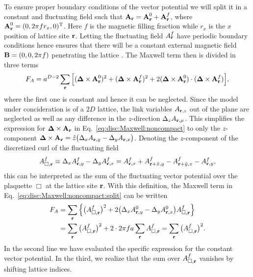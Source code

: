 To ensure proper boundary conditions of the vector potential we will split it in a constant and fluctuating field such that ${\boldsymbol{\mathbf{A}}}_{\boldsymbol{\mathbf{r}}} = {\boldsymbol{\mathbf{A}}}_{\boldsymbol{\mathbf{r}}}^0 + {\boldsymbol{\mathbf{A}}}_{\boldsymbol{\mathbf{r}}}^f$, where 
${\boldsymbol{\mathbf{A}}}^0_{\boldsymbol{\mathbf{r}}} = (0, 2\pi f r_x, 0)^\mathrm{T}$. Here $f$ is the magnetic filling fraction while $r_x$ is the $x$ position of lattice site ${\boldsymbol{\mathbf{r}}}$. Letting the fluctuating field $A_{\boldsymbol{\mathbf{r}}}^f$ have
periodic boundary conditions hence ensures that there will be a constant external magnetic field ${\boldsymbol{\mathbf{B}}} = (0,0, 2\pi f)$ penetrating the lattice \cite{Smorgrav05}. The Maxwell term then is divided in
three terms
\begin{equation}
  F_A = a^{D-2}\sum_{\boldsymbol{\mathbf{r}}}\Big[({\boldsymbol{\mathbf{\Delta}}}\times{\ensuremath{\boldsymbol{\mathbf{A}}}}_{\boldsymbol{\mathbf{r}}}^0)^2 + ({\boldsymbol{\mathbf{\Delta}}}\times{\ensuremath{\boldsymbol{\mathbf{A}}}}_{\boldsymbol{\mathbf{r}}}^f)^2 + 2({\boldsymbol{\mathbf{\Delta}}}\times{\ensuremath{\boldsymbol{\mathbf{A}}}}_{\boldsymbol{\mathbf{r}}}^0)\cdot({\boldsymbol{\mathbf{\Delta}}}\times{\ensuremath{\boldsymbol{\mathbf{A}}}}_{\boldsymbol{\mathbf{r}}}^f)\Big],
  \label{eq:disc:Maxwell:noncompact:split}
\end{equation}
where the first one is constant and hence it can be neglected. Since the model under concideration is of a $2D$ lattice, the link variables $A_{{\boldsymbol{\mathbf{r}}},z}$ out of the plane are neglected as well as any
difference in the $z$-direction $\Delta_zA_{{\boldsymbol{\mathbf{r}}},\mu}$. This simplifies the expression for ${\boldsymbol{\mathbf{\Delta}}}\times{\ensuremath{\boldsymbol{\mathbf{A}}}}_{\boldsymbol{\mathbf{r}}}$ in Eq.~\eqref{eq:disc:Maxwell:noncompact} to only the $z$-component
${\boldsymbol{\mathbf{\Delta}}}\times{\ensuremath{\boldsymbol{\mathbf{A}}}}_{\boldsymbol{\mathbf{r}}} = \hat{z}\big(\Delta_xA_{{\boldsymbol{\mathbf{r}}},y} - \Delta_yA_{{\boldsymbol{\mathbf{r}}},x}\big)$. Denoting the $z$-component of the discretized curl of the fluctuating field
\begin{equation}
  A^f_{\Box,{\boldsymbol{\mathbf{r}}}} \equiv \Delta_xA^f_{{\boldsymbol{\mathbf{r}}},y} - \Delta_yA^f_{{\boldsymbol{\mathbf{r}}},x} = A^f_{{\boldsymbol{\mathbf{r}}},x} + A^f_{{\boldsymbol{\mathbf{r}}}+\hat{x},y} - A^f_{{\boldsymbol{\mathbf{r}}}+\hat{y},x} - A^f_{{\boldsymbol{\mathbf{r}}},y},
  \label{eq:disc:plaquetteSum}
\end{equation}
this can be interpreted as the sum of the fluctuating vector potential over the plaquette $\Box$ at the lattice site ${\boldsymbol{\mathbf{r}}}$. With this definition, the Maxwell term 
in Eq.~\eqref{eq:disc:Maxwell:noncompact:split} can be written
\begin{equation}
  \begin{split}
	F_A &= \sum_{\boldsymbol{\mathbf{r}}}\Big\{\big(A^f_{\Box,{\boldsymbol{\mathbf{r}}}}\big)^2 + 2\big(\Delta_xA^0_{{\boldsymbol{\mathbf{r}}},y} - \Delta_yA^0_{{\boldsymbol{\mathbf{r}}},x}\big)A^f_{\Box,{\boldsymbol{\mathbf{r}}}}\Big\}\\
	&= \sum_{\boldsymbol{\mathbf{r}}}\big(A^f_{\Box,{\boldsymbol{\mathbf{r}}}}\big)^2 + 2\cdot2\pi fa\sum_{{\boldsymbol{\mathbf{r}}}}A^f_{\Box,{\boldsymbol{\mathbf{r}}}} = \sum_{\boldsymbol{\mathbf{r}}}\big(A^f_{\Box,{\boldsymbol{\mathbf{r}}}}\big)^2.
  \end{split}
  \label{eq:disc:Maxwell:plaquetteSum}
\end{equation}
In the second line we have evaluated the specific expression for the constant vector potential. In the third, we realize that the sum over $A^f_{\Box,{\boldsymbol{\mathbf{r}}}}$ vanishes
by shifting lattice indices.

